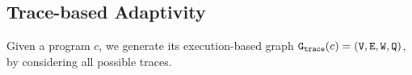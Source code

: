 %
\subsection{Trace-based Adaptivity}
Given a program $c$, we generate its execution-based graph 
$\mathtt{{G_{trace}}}({c}) = (\mathtt{V}, \mathtt{E}, \mathtt{W}, \mathtt{Q})$, by considering all possible traces.
%

